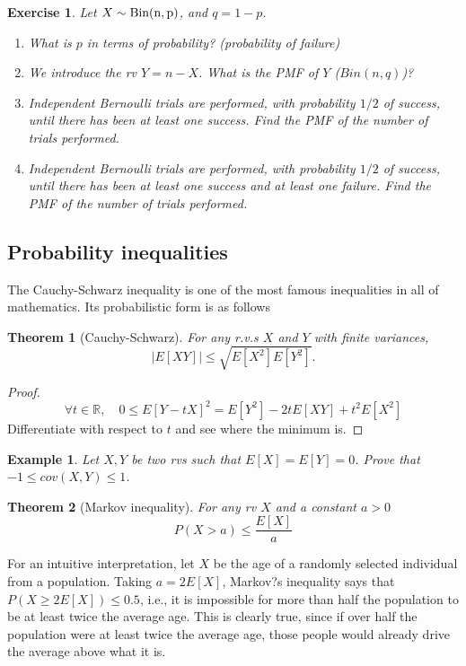 \documentclass[12pt,a4paper]{article}
\newtheorem{theorem}{Theorem}
\newtheorem{exercise}{Exercise}
\newtheorem{example}{Example}
\newcommand{\R}{\mathbb R}
\begin{document}
\begin{exercise}
	Let $X \sim {\rm Bin(n, p)}$, and $q = 1-p$.
	\begin{enumerate}
		\item What is $p$ in terms of probability? (probability of failure)
		\item We introduce the rv $Y = n-X$. What is the PMF of $Y$ ($Bin(n, q)$)?
	\item Independent Bernoulli trials are performed, with probability $1/2$ of success, until
	there has been at least one success. Find the PMF of the number of trials performed.
	\item Independent Bernoulli trials are performed, with probability $1/2$ of success, until there has been at least one success and at least one failure. 
	Find the PMF of the number of trials performed.
	\end{enumerate}
\end{exercise}

\subsection{Probability inequalities}
The Cauchy-Schwarz inequality is one of the most famous inequalities in all of mathematics. Its probabilistic form is as follows
\begin{theorem}[Cauchy-Schwarz]
	For any r.v.s $X$ and $Y$ with finite variances,
	\begin{equation}
		|E[XY]| \leq \sqrt{E[X^2]E[Y^2]}.
	\end{equation}
\end{theorem}
\begin{proof}
	\begin{equation}
		\forall t\in\R, \quad 0\leq E[Y-tX]^2 = E[Y^2]-2tE[XY]+t^2E[X^2]
	\end{equation}
	Differentiate with respect to $t$ and see where the minimum is.
\end{proof}
\begin{example}
	Let $X,Y$ be two rvs such that $E[X]=E[Y]= 0$.
	Prove that $-1\leq cov(X,Y)\leq 1$.
\end{example}
\begin{theorem}[Markov inequality]
	For any rv $X$ and a constant $a>0$
	\begin{equation}
		P(X>a)\leq\frac{E[X]}{a}
	\end{equation}
\end{theorem}
For an intuitive interpretation, let $X$ be the age of a randomly selected individual from a population. 
Taking $a = 2E[X]$, Markov?s inequality says that
$P (X \geq 2E[X]) \leq 0.5$, 
i.e., it is impossible for more than half the population
to be at least twice the average age. 
This is clearly true, since if over half the population were at least twice the average age, those people would already drive the average above what it is.
\end{document}
